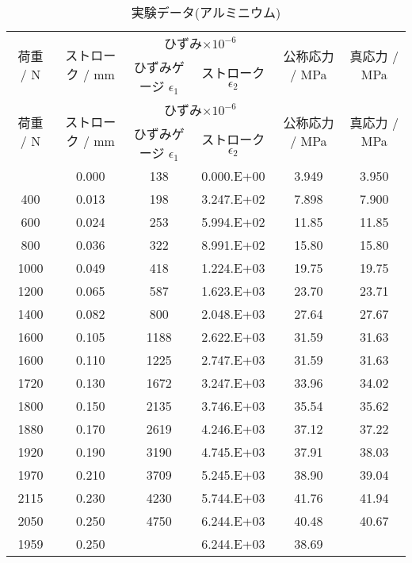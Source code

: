 \begin{longtable}{cccccc}
  \caption{実験データ(アルミニウム)}
  \label{tab:al_data} \\
  \hline
     \multirow{2}{*}{荷重 / N}&\multirow{2}{*}{ストローク / mm}&\multicolumn{2}{c}{ひずみ$\times10^{-6}$}&\multirow{2}{*}{公称応力 / MPa}&\multirow{2}{*}{真応力 / MPa}\\
     &&ひずみゲージ $\epsilon_1$&ストローク $\epsilon_2$\\
     \hline \hline
  \endfirsthead
  \hline
     \multirow{2}{*}{荷重 / N}&\multirow{2}{*}{ストローク / mm}&\multicolumn{2}{c}{ひずみ$\times10^{-6}$}&\multirow{2}{*}{公称応力 / MPa}&\multirow{2}{*}{真応力 / MPa}\\
     &&ひずみゲージ $\epsilon_1$&ストローク $\epsilon_2$\\
     \hline \hline
  \endhead
  \hline
  \endfoot
  \hline
  \endlastfoot
     200 & 0.000 & 138 & 0.000.E+00 & 3.949 & 3.950 \\
400 & 0.013 & 198 & 3.247.E+02 & 7.898 & 7.900 \\
600 & 0.024 & 253 & 5.994.E+02 & 11.85 & 11.85 \\
800 & 0.036 & 322 & 8.991.E+02 & 15.80 & 15.80 \\
1000 & 0.049 & 418 & 1.224.E+03 & 19.75 & 19.75 \\
1200 & 0.065 & 587 & 1.623.E+03 & 23.70 & 23.71 \\
1400 & 0.082 & 800 & 2.048.E+03 & 27.64 & 27.67 \\
1600 & 0.105 & 1188 & 2.622.E+03 & 31.59 & 31.63 \\
1600 & 0.110 & 1225 & 2.747.E+03 & 31.59 & 31.63 \\
1720 & 0.130 & 1672 & 3.247.E+03 & 33.96 & 34.02 \\
1800 & 0.150 & 2135 & 3.746.E+03 & 35.54 & 35.62 \\
1880 & 0.170 & 2619 & 4.246.E+03 & 37.12 & 37.22 \\
1920 & 0.190 & 3190 & 4.745.E+03 & 37.91 & 38.03 \\
1970 & 0.210 & 3709 & 5.245.E+03 & 38.90 & 39.04 \\
2115 & 0.230 & 4230 & 5.744.E+03 & 41.76 & 41.94 \\
2050 & 0.250 & 4750 & 6.244.E+03 & 40.48 & 40.67 \\
1959 & 0.250 &  & 6.244.E+03 & 38.69 &  \\

\end{longtable}
